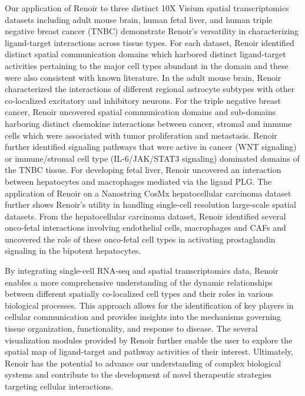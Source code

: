 Our application of Renoir to three distinct 10X Visium spatial transcriptomics datasets including adult mouse brain, human fetal liver, and human triple negative breast cancer (TNBC) demonstrate Renoir's versatility in characterizing ligand-target interactions across tissue types. For each dataset, Renoir identified distinct spatial communication domains which harbored distinct ligand-target activities pertaining to the major cell types abundant in the domain and these were also consistent with known literature. In the adult mouse brain, Renoir characterized the interactions of different regional astrocyte subtypes with other co-localized excitatory and inhibitory neurons. For the triple negative breast cancer, Renoir uncovered spatial communication domains and sub-domains harboring distinct chemokine interactions between cancer, stromal and immune cells which were associated with tumor proliferation and metastasis. Renoir further identified signaling pathways that were active in cancer (WNT signaling) or immune/stromal cell type (IL-6/JAK/STAT3 signaling) dominated domains of the TNBC tissue. For developing fetal liver, Renoir uncovered an interaction between hepatocytes and macrophages mediated via the ligand PLG. The application of Renoir on a Nanostring CosMx hepatocellular carcinoma dataset further shows Renoir's utility in handling single-cell resolution large-scale spatial datasets. From the hepatocellular carcinoma dataset, Renoir identified several onco-fetal interactions involving endothelial cells, macrophages and CAFs and uncovered the role of these onco-fetal cell types in activating prostaglandin signaling in the bipotent hepatocytes. \par

By integrating single-cell RNA-seq and spatial transcriptomics data, Renoir enables a more comprehensive understanding of the dynamic relationships between different spatially co-localized cell types and their roles in various biological processes. This approach allows for the identification of key players in cellular communication and provides insights into the mechanisms governing tissue organization, functionality, and response to disease. The several visualization modules provided by Renoir further enable the user to explore the spatial map of ligand-target and pathway activities of their interest. Ultimately, Renoir has the potential to advance our understanding of complex biological systems and contribute to the development of novel therapeutic strategies targeting cellular interactions.